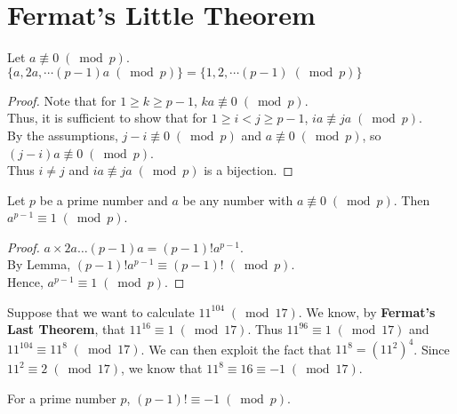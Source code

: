 \section{Fermat's Little Theorem}

\begin{lemma}
Let $a\not\equiv 0\; (\bmod{p})$. $\{a, 2a,\cdots (p - 1)a \; (\bmod{p})\} = \{1, 2,\cdots (p - 1) \; (\bmod{p})\}$
\end{lemma}

\begin{proof}
  Note that for $1\geq k\geq p - 1$, $ka\not\equiv 0\; (\bmod{p})$. \\
  Thus, it is sufficient to show that for $1\geq i < j\geq p - 1$, $ia\not\equiv ja\; (\bmod{p})$. \\ 
  By the assumptions, $j - i\not\equiv 0\; (\bmod{p})$ and $a\not\equiv 0\; (\bmod{p})$, so $(j - i)a\not\equiv 0\; (\bmod{p})$. \\
  Thus $i\neq j$ and $ia\not\equiv ja\; (\bmod{p})$ is a bijection.
\end{proof}

\begin{theorem}
  Let $p$ be a prime number and $a$ be any number with $a\not\equiv 0\; (\bmod{p})$. Then $a^{p - 1}\equiv 1\; (\bmod{p})$.
\end{theorem}

\begin{proof}
  $a\times 2a\dots (p - 1)a = (p - 1)!a^{p - 1}$. \\
  By Lemma, $(p - 1)!a^{p - 1}\equiv (p - 1)!\; (\bmod{p})$. \\
  Hence, $a^{p - 1}\equiv 1\; (\bmod{p})$.
\end{proof}

Suppose that we want to calculate $11^{104}\; (\bmod{17})$. We know, by \textbf{Fermat's Last Theorem}, that $11^{16}\equiv 1\; (\bmod{17})$. Thus $11^{96}\equiv 1\; (\bmod{17})$ and $11^{104}\equiv 11^{8}\; (\bmod{17})$. We can then exploit the fact that $11^{8} = (11^{2})^{4}$. Since $11^{2}\equiv 2\; (\bmod{17})$, we know that $11^{8}\equiv 16\equiv -1\; (\bmod{17})$.

\begin{theorem}
  For a prime number $p$, $(p - 1)!\equiv -1\; (\bmod{p})$.
\end{theorem}

